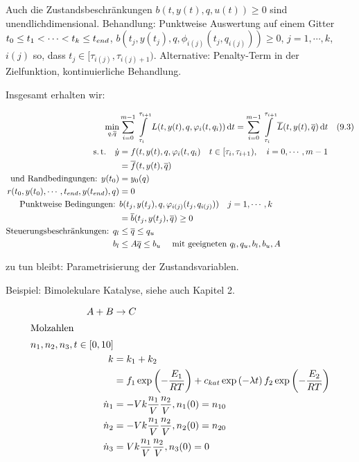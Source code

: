 Auch die Zustandsbeschränkungen $b(t,y(t),q,u(t)) \geq 0$ sind unendlichdimensional. Behandlung: Punktweise Auswertung auf einem Gitter $t_0 \leq t_1 < \cdots < t_k \leq {t_{end}}$, $b(t_j, y(t_j), q, \phi_{i(j)} (t_j, q_{i(j)})) \geq 0$, $j=1,\cdots,k$, $i(j)$ so, dass $t_j \in [\tau_{i(j)}, \tau_{i(j)+1})$. Alternative: Penalty-Term in der Zielfunktion, kontinuierliche Behandlung.

Insgesamt erhalten wir:

\begin{align*}
\min_{q,\overline q} &\sum\limits_{i=0}^{m-1} \int\limits_{\tau_i}^{\tau_{i+1}} L(t, y(t), q, \varphi_i(t, q_i)) \,\mathrm d t = \sum\limits_{i=0}^{m-1} \int\limits_{\tau_i}^{\tau_{i+1}} \overline L(t, y(t), \overline q) \,\mathrm d t \quad (9.3) \\
\text{s.\,t.} \quad \dot y &= f(t,y(t), q, \varphi_i(t,q_i) \quad t \in [\tau_i, \tau_{i+1}), \quad i = 0, \cdots, m-1 \\
&= \overline f(t,y(t),\overline q) \\
\text{und Randbedingungen: } y(t_0) &= y_0(q) \\
r(t_0, y(t_0), \cdots, {t_{end}}, y({t_{end}}), q) &= 0 \\
\text{Punktweise Bedingungen: } &b(t_j, y(t_j), q, \varphi_{i(j)} (t_j, q_{i(j)})) \quad j=1,\cdots, k \\
&= \overline b(t_j, y(t_j), \overline q) \geq 0 \\
\text{Steuerungsbeschränkungen: } q_l & \leq \overline q \leq q_u \\
b_l & \leq A\overline q \leq b_u \quad \text{ mit geeigneten } q_l, q_u, b_l, b_u, A 
\end{align*}

zu tun bleibt: Parametrisierung der Zustandsvariablen.

Beispiel: Bimolekulare Katalyse, siehe auch Kapitel 2.

\begin{align*}
A+B & \to C \\
\intertext{Molzahlen } n_1, n_2, n_3, t \in [0,10] \\
k &= k_1 + k_2 \\
&= f_1 \exp \left( -\frac{E_1}{RT} \right) +c_{kat} \exp \left( -\lambda t \right) f_2 \exp \left( - \frac{E_2}{RT} \right)\\
\dot n_1 &= - V k \frac{n_1}V \frac{n_2}V, n_1(0) = n_{10} \\
\dot n_2 &= - V k \frac{n_1}V \frac{n_2}V, n_2(0) = n_{20} \\
\dot n_3 &= V k \frac{n_1}V \frac{n_2}V, n_3(0) = 0 \\
\end{align*}

